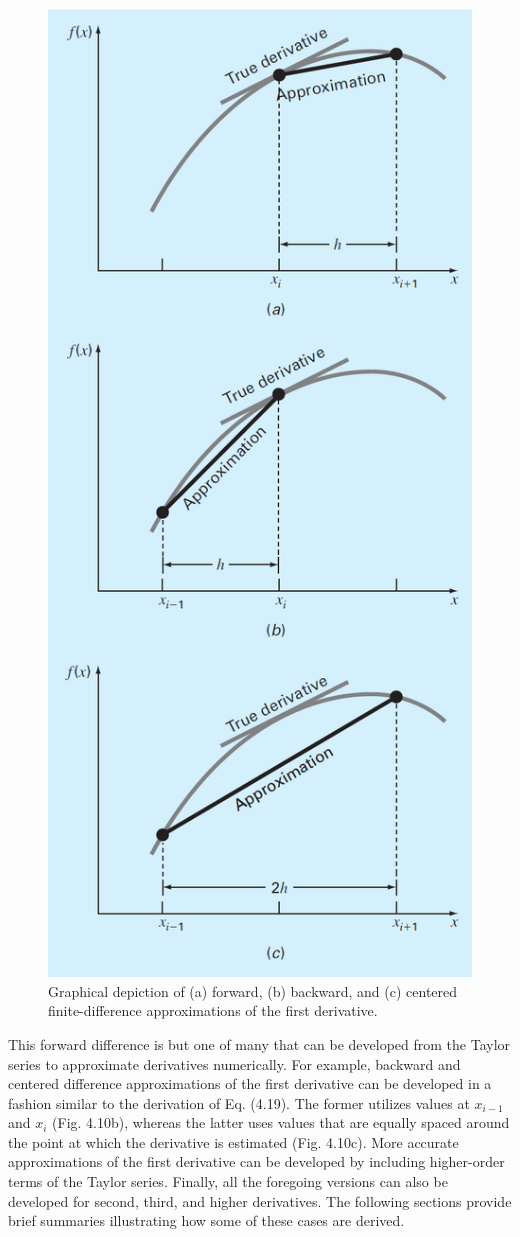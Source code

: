 \documentclass[../main.tex]{subfiles}
\begin{document}
\begin{figure}[h]
    \includegraphics[width=0.5\linewidth]{./images/fig_4_10}
    \caption{Graphical depiction of (a) forward, (b) backward, and (c) centered finite-difference
    approximations of the first derivative.}
\end{figure}
\newpage

This forward difference is but one of many that can be developed from the Taylor
series to approximate derivatives numerically. For example, backward and centered difference
approximations of the first derivative can be developed in a fashion similar to the
derivation of Eq. (4.19). The former utilizes values at $x_{i-1}$ and $x_i$ (Fig. 4.10b), whereas
the latter uses values that are equally spaced around the point at which the derivative is
estimated (Fig. 4.10c). More accurate approximations of the first derivative can be developed
by including higher-order terms of the Taylor series. Finally, all the foregoing versions
can also be developed for second, third, and higher derivatives. The following sections provide
brief summaries illustrating how some of these cases are derived.\\
\end{document}
